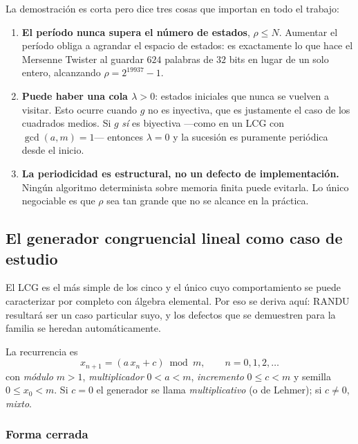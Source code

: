 La demostración es corta pero dice tres cosas que importan en todo el trabajo:

\begin{enumerate}
  \item \textbf{El período nunca supera el número de estados}, $\rho \le N$.
        Aumentar el período obliga a agrandar el espacio de estados: es
        exactamente lo que hace el Mersenne Twister al guardar $624$ palabras de
        $32$ bits en lugar de un solo entero, alcanzando $\rho = 2^{19937}-1$.
  \item \textbf{Puede haber una cola $\lambda > 0$}: estados iniciales que nunca
        se vuelven a visitar. Esto ocurre cuando $g$ no es inyectiva, que es
        justamente el caso de los cuadrados medios. Si $g$ \emph{sí} es
        biyectiva —como en un LCG con $\gcd(a,m)=1$— entonces $\lambda = 0$ y la
        sucesión es puramente periódica desde el inicio.
  \item \textbf{La periodicidad es estructural, no un defecto de implementación.}
        Ningún algoritmo determinista sobre memoria finita puede evitarla. Lo
        único negociable es que $\rho$ sea tan grande que no se alcance en la
        práctica.
\end{enumerate}

\subsection{El generador congruencial lineal como caso de estudio}
\label{sec:fundamento-lcg}

El LCG es el más simple de los cinco y el único cuyo comportamiento se puede
caracterizar por completo con álgebra elemental. Por eso se deriva aquí: RANDU
resultará ser un caso particular suyo, y los defectos que se demuestren para la
familia se heredan automáticamente.

La recurrencia es
\begin{equation}
  x_{n+1} = (a\,x_n + c) \bmod m,
  \qquad n = 0, 1, 2, \dots
  \label{eq:lcg}
\end{equation}
con \emph{módulo} $m > 1$, \emph{multiplicador} $0 < a < m$, \emph{incremento}
$0 \le c < m$ y semilla $0 \le x_0 < m$. Si $c = 0$ el generador se llama
\emph{multiplicativo} (o de Lehmer); si $c \neq 0$, \emph{mixto}.

\subsubsection{Forma cerrada}

